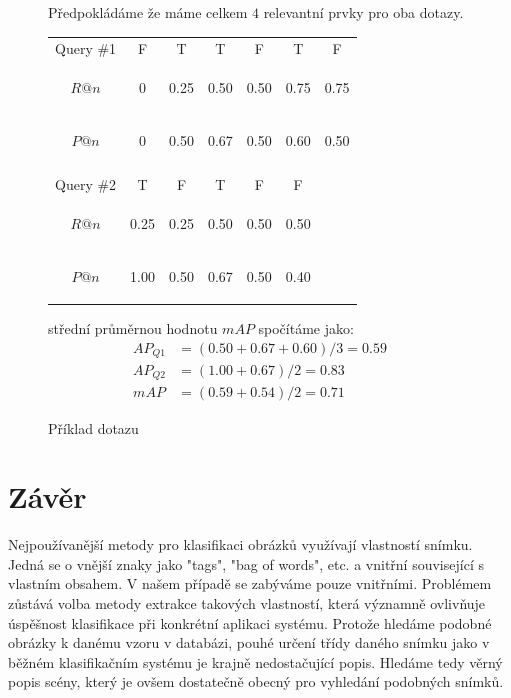 \documentclass[12pt]{article}
\begin{document}
\begin{figure}[h]
Předpokládáme že máme celkem $4$ relevantní prvky pro oba dotazy.

\begin{tabular}{*7c}
Query \#1&F&T&T&F&T&F\\
\begin{small}
$R@n$
\end{small}&
0&0.25&0.50&0.50&0.75&0.75\\
\begin{small}
$P@n$
\end{small}&
0&0.50&0.67&0.50&0.60&0.50\\\\

Query \#2&T&F&T&F&F\\
\begin{small}
$R@n$
\end{small}&
0.25&0.25&0.50&0.50&0.50\\
\begin{small}
$P@n$
\end{small}&
1.00&0.50&0.67&0.50&0.40

\end{tabular}


\caption{Příklad dotazu}

střední průměrnou hodnotu $mAP$ spočítáme jako:
\begin{equation}
\nonumber
\begin{split}
AP_{Q1} &= {(0.50+0.67+0.60)}/{3}=0.59\\
AP_{Q2} &= {(1.00+0.67)}/{2}=0.83\\
mAP &= {(0.59+0.54)}/{2}=0.71
\end{split}
\end{equation}

\label{met_example}
\end{figure}

\section{Závěr}
Nejpoužívanější metody pro klasifikaci obrázků využívají vlastností snímku. Jedná se o vnější znaky jako "tags", "bag of words", etc. a vnitřní související s vlastním obsahem. V našem případě se zabýváme pouze vnitřními. Problémem zůstává volba metody extrakce takových vlastností, která významně ovlivňuje úspěšnost klasifikace při konkrétní aplikaci systému. Protože hledáme podobné obrázky k danému vzoru v databázi, pouhé určení třídy daného snímku jako v běžném klasifikačním systému je krajně nedostačující popis. Hledáme tedy věrný popis scény, který je ovšem dostatečně obecný pro vyhledání podobných snímků.
\end{document}

